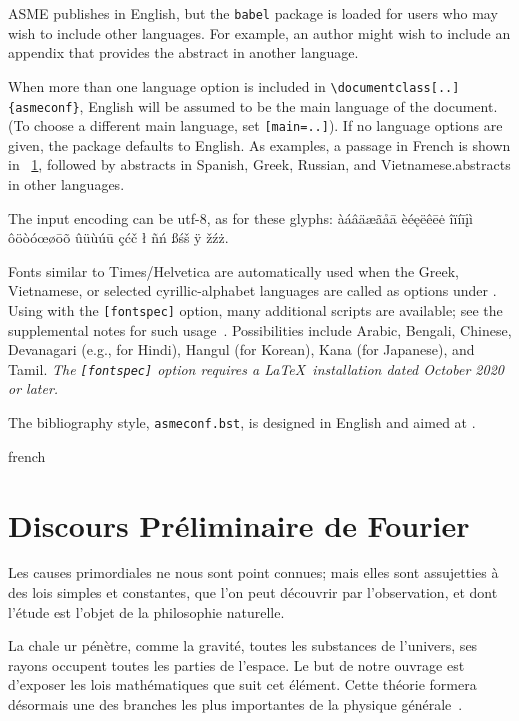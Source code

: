 \documentclass[grid,balance,upint,subscriptcorrection,varvw,mathalfa=cal=euler,spanish,french,greek,russian,vietnamese,colorlinks]{asmeconf}
\begin{document}
ASME publishes in English, but the \texttt{babel} package is loaded for 
users who may wish to include other languages. For example, an author might wish to include an appendix that provides the 
abstract in another language.

When more than one language option is included in \verb|\documentclass[..]{asmeconf}|, English will be 
assumed to be the main language of the document. (To choose a different main language, set \texttt{[main=..]}).
If no language options are given, the package defaults to English.  As examples, a passage in French is 
shown in \appendixname~\ref{app:fourier}, followed by 
\ifpdftex abstracts in Spanish, Greek, Russian, and Vietnamese.\else abstracts in other languages.\fi

The input encoding can be utf-8, as for these glyphs:
%
àáâäæãåā  èéęëêēė  îïíīįì ôöòóœøōõ ûüùúū çćč ł ñń ßśš ÿ žźż.

Fonts similar to Times/Helvetica are automatically used when the Greek, Vietnamese, or selected cyrillic-alphabet languages are called as options under {\upshape{}}. Using {\upshape{}} with the \texttt{[fontspec]} option, many additional scripts are available; see the supplemental notes for such usage~\cite{lienhard2021}. Possibilities include Arabic, Bengali, Chinese, Devanagari (e.g., for Hindi), Hangul (for Korean), Kana (for Japanese), and Tamil. \textit{The {\upshape\texttt{[fontspec]}} option requires a \LaTeX\ installation dated October 2020 or later.}

The bibliography style, \texttt{asmeconf.bst}, is designed in English and aimed at .  


\begin{selectlanguage}{french}%
\section{Discours Préliminaire de Fourier}\label{app:fourier}
Les causes primordiales ne nous sont point con­nues; mais elles sont assujetties à des lois simples et constantes, que l'on peut découvrir par l'obser­vation, et dont l'étude est l'objet de la philosophie naturelle. 

La chale ur pénètre, comme la gravité, toutes les substances de l'univers, ses rayons occupent toutes les parties de l'espace. Le but de notre ouvrage est d'exposer les lois mathématiques que suit cet élé­ment. Cette théorie formera désormais une des branches les plus importantes de la physique gé­nérale~\cite{fourier1822}. 
\end{selectlanguage}%
 
\end{document}
